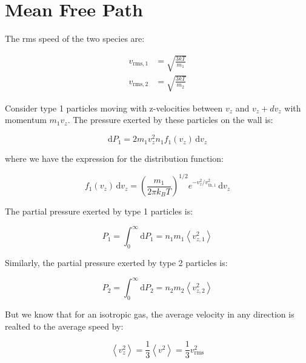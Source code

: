 \documentclass[12pt]{article}
\begin{document}



\pagebreak
\section*{Mean Free Path}


The rms speed of the two species are:

\begin{equation}
\begin{aligned}
    v_{\text{rms},1} &= \sqrt{\frac{3kT}{m_1}} \\
    v_{\text{rms},2} &= \sqrt{\frac{3kT}{m_2}}
\end{aligned}
\end{equation}

Consider type 1 particles moving with z-velocities between $v_{z}$ and $v_{z} + dv_{z}$ with momentum $m_{1}v_{z}$. The pressure exerted by these particles on the wall is:

\begin{equation}
    \mathrm{d}P_{1} = 2m_{1}v_{z}^{2}n_{1}f_{1}(v_{z}) \, \mathrm{d}v_{z}
\end{equation}

where we have the expression for the distribution function:

\begin{equation}
    f_{1}(v_{z}) \, \mathrm{d}v_{z} = \left( \frac{m_{1}}{2\pi k_{B}T} \right)^{1/2} e^{-v_{z}^{2}/v_{\text{th},1}^{2}} \, \mathrm{d}v_{z}
\end{equation}

The partial pressure exerted by type 1 particles is:

\begin{equation}
    P_{1} = \int_{0}^{\infty} \mathrm{d}P_{1} = n_{1}m_{1} \left\langle v_{z, 1}^{2} \right\rangle
\end{equation}

Similarly, the partial pressure exerted by type 2 particles is:

\begin{equation}
    P_{2} = \int_{0}^{\infty} \mathrm{d}P_{2} = n_{2}m_{2} \left\langle v_{z, 2}^{2} \right\rangle
\end{equation}

But we know that for an isotropic gas, the average velocity in any direction is realted to the average speed by:

\begin{equation}
    \left\langle v_{z}^{2} \right\rangle = \frac{1}{3} \left\langle v^{2} \right\rangle = \frac{1}{3} v_{\text{rms}}^{2}
\end{equation}
\end{document}
